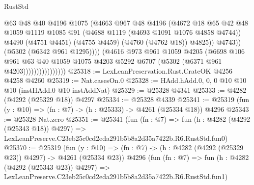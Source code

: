 \begin{lexlean}{RustStd}
\begin{coremodule}
                                    @63
                                    @48
                                    @40
                                    @4196
                                    @1075
                                    (@4663
                                      @967
                                      @48
                                      @4196
                                      (@4672
                                        @18
                                        @65
                                        @42
                                        @48
                                        @1059
                                        @1119
                                        @1085
                                        @91
                                        (@4688 @1119 (@4693 @1091 @1076 @4858 @4744))
                                        @4490
                                        (@4751 @4451)
                                        (@4755 @4459)
                                        (@4760 (@4762 @18))
                                        @4825))
                                    @4743))
                                (@5302 (@6342 @961 @1295))))
                            (@4616
                              @973
                              @961
                              @1059
                              @4205
                              (@6698
                                @106
                                @961
                                @63
                                @40
                                @1059
                                @1075
                                @4203
                                @5292
                                @6707
                                (@5302 (@6371 @961 @4203))))))))))))))))
@25318 := LexLeanPreservation.Rust.CrateOK @4256 @4258 @4260
@25319 := Nat.casesOn.{0}
@25328 := HAdd.hAdd.{0, 0, 0} @10 @10 @10 (instHAdd.{0} @10 instAddNat)
@25329 := @25328 @4341
@25333 := @4282 (@4292 (@25329 @18)) @4297
@25334 := @25328 @4339
@25341 := @25319 (fun (y : @10) => (fn : @7) -> (h : @25333) -> @4261 (@25334 @18)) @4296
@25343 := @25328 Nat.zero
@25351 := @25341
    (fun (fn : @7) =>
    fun (h : @4282 (@4292 (@25343 @18)) @4297) =>
    LexLeanPreserve.C23eb25c0cd2eda291b5b8a2d35a7422b.R6.RustStd.fun0)
@25370 := @25319
    (fun (y : @10) => (fn : @7) -> (h : @4282 (@4292 (@25329 @23)) @4297) -> @4261 (@25334 @23))
    @4296
    (fun (fn : @7) =>
    fun (h : @4282 (@4292 (@25343 @23)) @4297) =>
    LexLeanPreserve.C23eb25c0cd2eda291b5b8a2d35a7422b.R6.RustStd.fun1)

\end{coremodule}
\end{lexlean}

